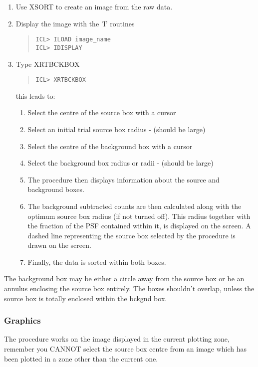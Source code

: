 \documentclass{book}
\renewcommand{\_}{{\tt\char'137}}     %
\begin{document}
\begin{enumerate}
\item Use XSORT to create an image from the raw data.
\item Display the image with the 'I' routines
\begin{quote}\begin{verbatim}
ICL> ILOAD image_name
ICL> IDISPLAY
\end{verbatim}\end{quote}
\item Type XRTBCKBOX
\begin{quote}\begin{verbatim}
ICL> XRTBCKBOX
\end{verbatim}\end{quote}
this leads to:

\begin{enumerate}
\item Select the centre of the source box with a cursor
\item Select an initial trial source box radius - (should be large)
\item Select the centre of the background box with a cursor
\item Select the background box radius or radii - (should be large)
\item The procedure then displays information about the source and
background boxes.
\item The background subtracted counts are then calculated along
with the optimum source box radius (if not turned off).
This radius together with the fraction of the PSF contained
within it, is displayed on the screen. A dashed line
representing the source box selected by the procedure is
drawn on the screen.
\item Finally, the data is sorted within both boxes.
\end{enumerate}
\end{enumerate}
The background box may be either a circle away from the source box or
be an annulus enclosing the source box entirely. The boxes shouldn't
overlap, unless the source box is totally enclosed within the bckgnd
box.

\subsubsection{Graphics}
The procedure works on the image displayed in the current plotting zone,
remember you CANNOT select the source box centre from an image which
has been plotted in a zone other than the current one.
\end{document}
